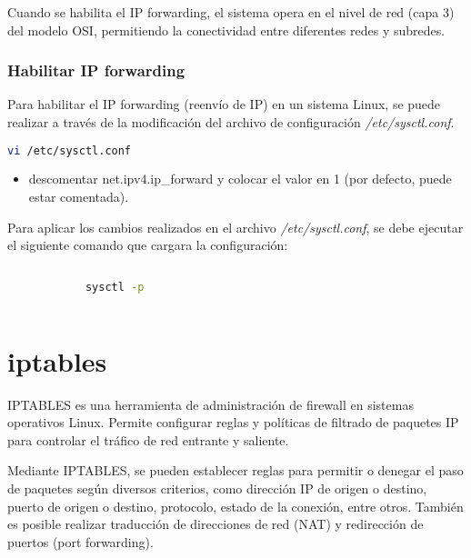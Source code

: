 		Cuando se habilita el IP forwarding, el sistema opera en el nivel de red (capa 3) del modelo OSI, permitiendo la conectividad entre diferentes redes y subredes.\cite{Hobbyists}
		
		\subsubsection{Habilitar IP forwarding}
		
		Para habilitar el IP forwarding (reenvío de IP) en un sistema Linux, se puede realizar a través de la modificación del archivo de configuración \textit{/etc/sysctl.conf}.
		
		\begin{lstlisting}[language=Bash, caption=IP forwarding]
			vi /etc/sysctl.conf
		\end{lstlisting}
		
		\begin{itemize}
			
			\item descomentar net.ipv4.ip\_forward y colocar el valor en 1 (por defecto, puede estar comentada).
			
		\end{itemize}
		
		Para aplicar los cambios realizados en el archivo \textit{/etc/sysctl.conf}, se debe ejecutar el siguiente comando que cargara la configuración:
		
		\begin{lstlisting}[language=Bash, caption=Cargar Configuración]
			
			sysctl -p
			
		\end{lstlisting}
		
		
				
		\section{iptables}
		
		IPTABLES es una herramienta de administración de firewall en sistemas operativos Linux. Permite configurar reglas y políticas de filtrado de paquetes IP para controlar el tráfico de red entrante y saliente.\par
		
		Mediante IPTABLES, se pueden establecer reglas para permitir o denegar el paso de paquetes según diversos criterios, como dirección IP de origen o destino, puerto de origen o destino, protocolo, estado de la conexión, entre otros. También es posible realizar traducción de direcciones de red (NAT) y redirección de puertos (port forwarding).\par
		

